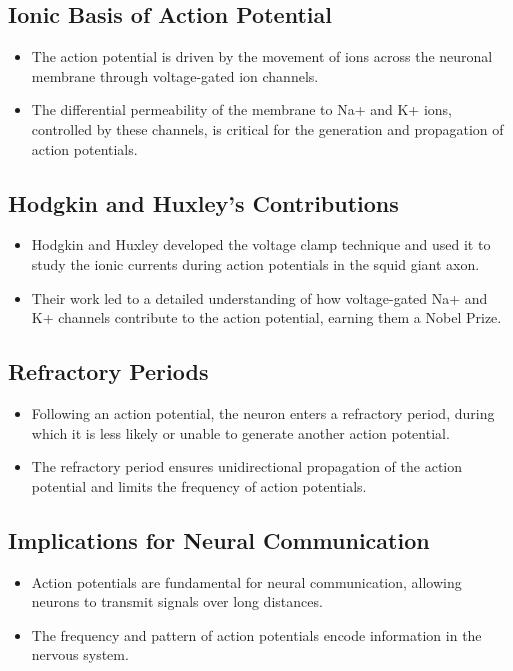 \documentclass{article}
\begin{document}
\subsection{Ionic Basis of Action Potential}
\begin{itemize}
    \item The action potential is driven by the movement of ions across the neuronal membrane through voltage-gated ion channels.
    \item The differential permeability of the membrane to Na+ and K+ ions, controlled by these channels, is critical for the generation and propagation of action potentials.
\end{itemize}

\subsection{Hodgkin and Huxley's Contributions}
\begin{itemize}
    \item Hodgkin and Huxley developed the voltage clamp technique and used it to study the ionic currents during action potentials in the squid giant axon.
    \item Their work led to a detailed understanding of how voltage-gated Na+ and K+ channels contribute to the action potential, earning them a Nobel Prize.
\end{itemize}

\subsection{Refractory Periods}
\begin{itemize}
    \item Following an action potential, the neuron enters a refractory period, during which it is less likely or unable to generate another action potential.
    \item The refractory period ensures unidirectional propagation of the action potential and limits the frequency of action potentials.
\end{itemize}

\subsection{Implications for Neural Communication}
\begin{itemize}
    \item Action potentials are fundamental for neural communication, allowing neurons to transmit signals over long distances.
    \item The frequency and pattern of action potentials encode information in the nervous system.
\end{itemize}
\end{document}
